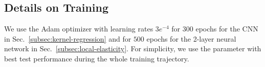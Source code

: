 

\subsection{Details on Training}
\label{subsec:experimental-settings}
We use the Adam optimizer \citep{kingma2014adam} with learning rates $3e^{-4}$ for $300$ epochs for the CNN in Sec.~\ref{subsec:kernel-regression} and for $500$ epochs for the 2-layer neural network in Sec.~\ref{subsec:local-elasticity}. For simplicity, we use the parameter with best test performance during the whole training trajectory. 
